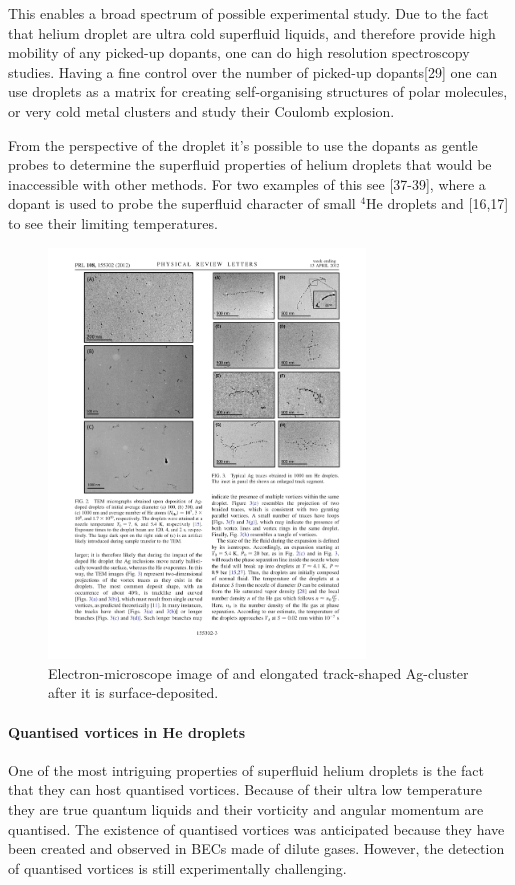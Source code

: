 		This enables a broad spectrum of possible experimental study. Due to the fact that helium droplet are ultra cold superfluid liquids, and therefore provide high mobility of any picked-up dopants, one can do high resolution spectroscopy studies. Having a fine control over the number of picked-up dopants[29] one can use droplets as a matrix for creating self-organising structures of polar molecules, or very cold metal clusters and study their Coulomb explosion.
		
		From the perspective of the droplet it's possible to use the dopants as gentle probes to determine the superfluid properties of helium droplets that would be inaccessible with other methods. For two examples of this see [37-39], where a dopant is used to probe the superfluid character of small $^4$He droplets and [16,17] to see their limiting temperatures.
		
		\begin{figure}[t]
			\begin{center}
				\includegraphics[width=0.75\textwidth]{silver-filament}
				\caption{Electron-microscope image of and elongated track-shaped Ag-cluster after it is surface-deposited.}
				\label{fig:silver-filament}
			\end{center}
		\end{figure}	
				
		\paragraph{Quantised vortices in He droplets} One of the most intriguing properties of superfluid helium droplets is the fact that they can host quantised vortices. Because of their ultra low temperature they are true quantum liquids and their vorticity and angular momentum are quantised. The existence of quantised vortices was anticipated because they have been created and observed in BECs made of dilute gases. However, the detection of quantised vortices is still experimentally challenging.
		
